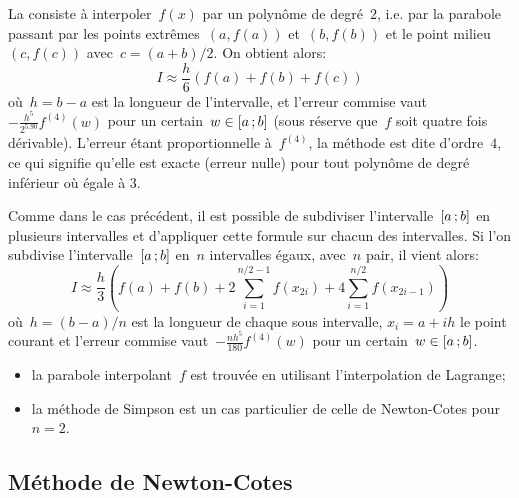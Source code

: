 La  consiste à interpoler~$f(x)$ par un polynôme de degré~$2$, i.e. par la parabole passant par les points extrêmes~$(a,f(a))$ et~$(b,f(b))$ et le point milieu~$(c,f(c))$ avec~$c=(a+b)/2$. On obtient alors: 
\begin{equation}
 I\approx \frac{h}{6} \left( f(a)+f(b)+f(c)\right)
\end{equation}
où~$h=b-a$ est la longueur de l'intervalle, et l'erreur commise vaut~$-\frac{h^5}{2^5.90} f^{(4)}(w)$ pour un certain~$w\in\mathopen{[}a\,;b\mathclose{]}$ (sous réserve que~$f$ soit quatre fois dérivable). L'erreur étant proportionnelle à~$f^{(4)}$, la méthode est dite d'ordre~$4$, ce qui signifie qu'elle est exacte (erreur nulle) pour tout polynôme de degré inférieur où égale à 3. 

Comme dans le cas précédent, il est possible de subdiviser l'intervalle~$\mathopen{[}a\,;b\mathclose{]}$ en plusieurs intervalles et d'appliquer cette formule sur chacun des intervalles. Si l'on subdivise l'intervalle~$\mathopen{[}a\,;b\mathclose{]}$ en~$n$ intervalles égaux, avec~$n$ pair, il vient alors: 
\begin{equation}
 I\approx \frac{h}{3} \left( f(a)+f(b)+2\sum_{i=1}^{n/2-1}f(x_{2i})+4\sum_{i=1}^{n/2}f(x_{2i-1}) \right)
\end{equation}
où~$h=(b-a)/n$ est la longueur de chaque sous intervalle, $x_i=a+ih$ le point courant et l'erreur commise vaut~$-\frac{nh^5}{180} f^{(4)}(w)$ pour un certain~$w\in\mathopen{[}a\,;b\mathclose{]}$. 
\begin{remarque}[Remarques]\mbox{}
\begin{itemize}
\item la parabole interpolant~$f$ est trouvée en utilisant l'interpolation de Lagrange; 
\item la méthode de Simpson est un cas particulier de celle de Newton-Cotes pour~$n=2$. 
\end{itemize}
\end{remarque}

\medskip
\subsection*{Méthode de Newton-Cotes} 

